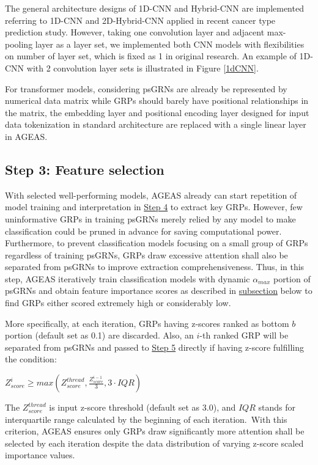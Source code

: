 \documentclass[fleqn,10pt]{wlscirep}
\begin{document}
    The general architecture designs of 1D-CNN and Hybrid-CNN are implemented referring to 1D-CNN and 2D-Hybrid-CNN applied in recent cancer type prediction study.\cite{mostavi_chiu_huang_chen_2020}
    However, taking one convolution layer and adjacent max-pooling layer as a layer set, we implemented both CNN models with flexibilities on number of layer set, which is fixed as 1 in original research.
    An example of 1D-CNN with 2 convolution layer sets is illustrated in Figure \ref{1dCNN}.

    For transformer models, considering psGRNs are already be represented by numerical data matrix while GRPs should barely have positional relationships in the matrix, the embedding layer and positional encoding layer designed for input data tokenization in standard architecture \cite{transformer} are replaced with a single linear layer in AGEAS.

  \subsection*{Step 3: Feature selection}
    \label{step3}
    With selected well-performing models, AGEAS already can start repetition of model training and interpretation in \hyperref[step4]{Step 4} to extract key GRPs.
    However, few uninformative GRPs in training psGRNs merely relied by any model to make classification could be pruned in advance for saving computational power.
    Furthermore, to prevent classification models focusing on a small group of GRPs regardless of training psGRNs, GRPs draw excessive attention shall also be separated from psGRNs to improve extraction comprehensiveness.
    Thus, in this step, AGEAS iteratively train classification models with dynamic $\alpha_{max}$ portion of psGRNs and obtain feature importance scores as described in \hyperref[features_importances]{subsection} below to find GRPs either scored extremely high or considerably low.

    More specifically, at each iteration, GRPs having z-scores ranked as bottom $b$ portion (default set as 0.1) are discarded.
    Also, an $i$-th ranked GRP will be separated from psGRNs and passed to \hyperref[step5]{Step 5} directly if having z-score fulfilling the condition:

    \centerline{
      $Z_{score}^{i} \ge max(Z_{score}^{thread}, \frac{Z_{score}^{i-1}}{3}, 3 \cdot IQR)$
    }

    \noindent The $Z_{score}^{thread}$ is input z-score threshold (default set as 3.0), and $IQR$ stands for interquartile range calculated by the beginning of each iteration.\
    With this criterion, AGEAS ensures only GRPs draw significantly more attention shall be selected by each iteration despite the data distribution of varying z-score scaled importance values.
\end{document}
